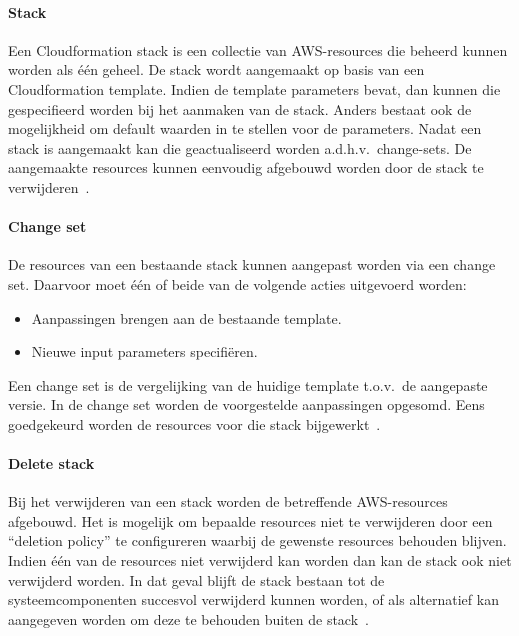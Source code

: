 \paragraph{Stack}

Een Cloudformation stack is een collectie van AWS-resources die beheerd kunnen worden als één geheel.
De stack wordt aangemaakt op basis van een Cloudformation template.
Indien de template parameters bevat, dan kunnen die gespecifieerd worden bij het aanmaken van de stack.
Anders bestaat ook de mogelijkheid om default waarden in te stellen voor de parameters.
Nadat een stack is aangemaakt kan die geactualiseerd worden a.d.h.v.\ change-sets.
De aangemaakte resources kunnen eenvoudig afgebouwd worden door de stack te verwijderen~\autocite{AWSCLoudformationUser}.

\paragraph{Change set}

De resources van een bestaande stack kunnen aangepast worden via een change set.
Daarvoor moet één of beide van de volgende acties uitgevoerd worden:

\begin{itemize}
    \item Aanpassingen brengen aan de bestaande template.
    \item Nieuwe input parameters specifiëren.
\end{itemize}

Een change set is de vergelijking van de huidige template t.o.v.\ de aangepaste versie.
In de change set worden de voorgestelde aanpassingen opgesomd.
Eens goedgekeurd worden de resources voor die stack bijgewerkt~\autocite{AWSCLoudformationUser}.

\paragraph{Delete stack}

Bij het verwijderen van een stack worden de betreffende AWS-resources afgebouwd.
Het is mogelijk om bepaalde resources niet te verwijderen door een “deletion policy” te configureren waarbij de gewenste resources behouden blijven.
Indien één van de resources niet verwijderd kan worden dan kan de stack ook niet verwijderd worden.
In dat geval blijft de stack bestaan tot de systeemcomponenten succesvol verwijderd kunnen worden, of als alternatief kan aangegeven worden om deze te behouden buiten de stack~\autocite{AWSCLoudformationUser}.

